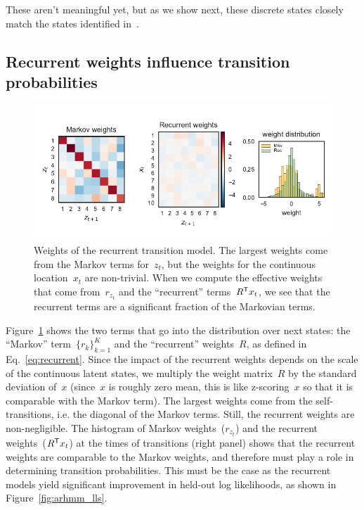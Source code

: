 \documentclass{article}
\begin{document}
These aren't meaningful yet, but as we show next, these discrete states closely
match the states identified in~\citep{kato2015global}. 

\clearpage

\subsection{Recurrent weights influence transition probabilities}

\begin{figure}[h]
\centering%
\includegraphics[width=5.5in]{figures/arhmm/recurrent_weights.pdf}
\caption{Weights of the recurrent transition model.  The largest
  weights come from the Markov terms for~$z_{t}$, but the weights
  for the continuous location~$x_t$ are non-trivial.  When we
  compute the effective weights that come from~$r_{z_t}$ and
  the ``recurrent'' terms~$R^{\mathsf{T}} x_t$, we see that the recurrent terms
  are a significant fraction of the Markovian terms. }
\label{fig:rec_weights}
\end{figure}

Figure~\ref{fig:rec_weights} shows the two terms that go into the
distribution over next states: the ``Markov'' term~$\{r_{k}\}_{k=1}^K$
and the ``recurrent'' weights~$R$, as defined in
Eq.~\eqref{eq:recurrent}.  Since the impact of the recurrent weights
depends on the scale of the continuous latent states, we multiply the
weight matrix~$R$ by the standard deviation of~$x$ (since~$x$ is
roughly zero mean, this is like z-scoring~$x$ so that it is comparable
with the Markov term).  The largest weights come from the
self-transitions, i.e. the diagonal of the Markov terms. Still, the
recurrent weights are non-negligible. The histogram of Markov
weights~($r_{z_t}$) and the recurrent weights~($R^{\mathsf{T}} x_t$) at the
times of transitions (right panel) shows that the recurrent weights
are comparable to the Markov weights, and therefore must play a role
in determining transition probabilities.  This must be the case as the
recurrent models yield significant improvement in held-out log
likelihoods, as shown in Figure~\ref{fig:arhmm_lls}.
\end{document}
